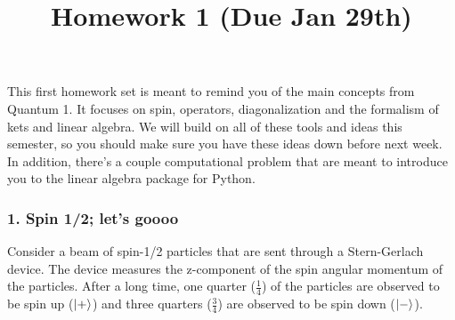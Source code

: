\documentclass[
]{article}
\title{Homework 1 (Due Jan 29th)}
\author{}
\date{}
\begin{document}
\maketitle

This first homework set is meant to remind you of the main concepts from
Quantum 1. It focuses on spin, operators, diagonalization and the
formalism of kets and linear algebra. We will build on all of these
tools and ideas this semester, so you should make sure you have these
ideas down before next week. In addition, there's a couple computational
problem that are meant to introduce you to the linear algebra package
for Python.

\hypertarget{spin-12-lets-goooo}{%
\subsubsection{1. Spin 1/2; let's goooo}\label{spin-12-lets-goooo}}

Consider a beam of spin-1/2 particles that are sent through a
Stern-Gerlach device. The device measures the z-component of the spin
angular momentum of the particles. After a long time, one quarter
(\(\frac{1}{4}\)) of the particles are observed to be spin up
(\(\ket{+}\)) and three quarters (\(\frac{3}{4}\)) are observed to be
spin down (\(\ket{-}\)).
\end{document}
